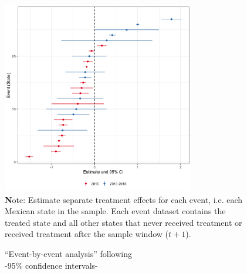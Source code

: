 \documentclass[12pt]{amsart}
\numberwithin{equation}{section}
\theoremstyle{definition}
\theoremstyle{definition}
\theoremstyle{definition}
\begin{document}
\begin{figure}[H]
\centering
\caption{``Event-by-event analysis'' following \citet{cengiz_etal_2019}\\ -95\% confidence intervals-} 
\label{fig:CDLZ_agreements}
\includegraphics[width=0.75\textwidth]{../Figures/CDLZ_cov_acuerdo.png}
       \captionsetup{justification=centering}
       \\
 {\textbf Note:} Estimate separate treatment effects for each event, i.e. each Mexican state in the sample. Each event dataset contains the treated state and all other states that never received treatment or received treatment after the sample window ($t+1$).   
\end{figure}   
\end{document}
